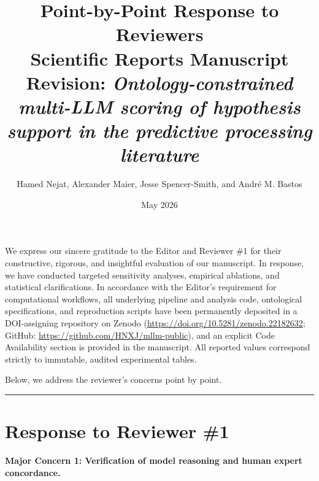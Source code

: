 \documentclass[11pt]{article}
\title{\textbf{Point-by-Point Response to Reviewers}\\
\large Scientific Reports Manuscript Revision: \emph{Ontology-constrained multi-LLM scoring of hypothesis support in the predictive processing literature}}
\author{Hamed Nejat, Alexander Maier, Jesse Spencer-Smith, and Andr\'e M. Bastos}
\date{May 2026}
\newcommand{\reviewercomment}[1]{\vspace{1em}\noindent\textbf{\color{blue!80!black}#1}\vspace{0.4em}}
\begin{document}
\maketitle

We express our sincere gratitude to the Editor and Reviewer \#1 for their constructive, rigorous, and insightful evaluation of our manuscript. In response, we have conducted targeted sensitivity analyses, empirical ablations, and statistical clarifications. In accordance with the Editor's requirement for computational workflows, all underlying pipeline and analysis code, ontological specifications, and reproduction scripts have been permanently deposited in a DOI-assigning repository on Zenodo (\url{https://doi.org/10.5281/zenodo.22182632}; GitHub: \url{https://github.com/HNXJ/mllm-public}), and an explicit Code Availability section is provided in the manuscript. All reported values correspond strictly to immutable, audited experimental tables.

Below, we address the reviewer's concerns point by point.

\vspace{1.5em}
\hrule
\vspace{1.5em}

\section*{Response to Reviewer \#1}

\reviewercomment{Major Concern 1: Verification of model reasoning and human expert concordance.}
\end{document}
